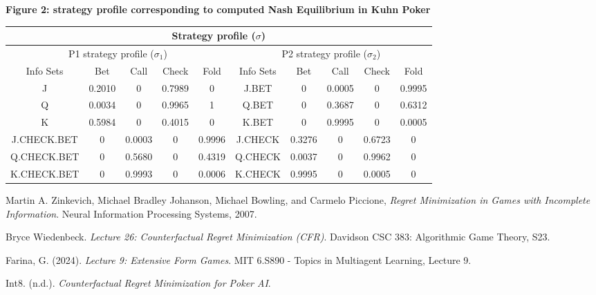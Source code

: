 \documentclass{article}
\begin{document}
\begin{center}
\textbf{Figure 2: strategy profile corresponding to computed Nash Equilibrium in Kuhn Poker}
\begin{tabular}{||c | c c c c||c | c c c c||}
\hline\hline

 \multicolumn{10}{||c||}{Strategy profile ($\sigma$)} \\
 
\hline\hline
 \multicolumn{5}{||c||}{P1 strategy profile ($\sigma_1$)} & 
 \multicolumn{5}{||c||}{P2 strategy profile ($\sigma_2$)} \\

 \hline
 Info Sets & Bet & Call & Check  & Fold &
 Info Sets & Bet & Call & Check  & Fold
 \\ [0.5ex] 
 \hline\hline
 J & 0.2010 & 0 & 0.7989 & 0 & 
 J.BET & 0 & 0.0005 & 0 & 0.9995\\ [1ex] 
 \hline
 Q & 0.0034 & 0 & 0.9965 & 1 & 
 Q.BET & 0 & 0.3687 & 0 & 0.6312\\ [1ex] 
 \hline
 K & 0.5984 & 0 & 0.4015 & 0 & 
 K.BET & 0 & 0.9995 & 0 & 0.0005\\ [1ex] 
 \hline
 J.CHECK.BET & 0 & 0.0003 & 0 & 0.9996 & 
 J.CHECK & 0.3276 & 0 & 0.6723 & 0\\ [1ex] 
 \hline
 Q.CHECK.BET & 0 & 0.5680 & 0 & 0.4319 & 
 Q.CHECK & 0.0037 & 0 & 0.9962 & 0\\ [1ex] 
 \hline
 K.CHECK.BET & 0 & 0.9993 & 0 & 0.0006 & 
 K.CHECK & 0.9995 & 0 & 0.0005 & 0\\ [1ex] 
 \hline
\end{tabular}
\end{center}

\newpage


\begin{thebibliography}{9}

Martin A. Zinkevich, Michael Bradley Johanson, Michael Bowling, and Carmelo Piccione, \emph{Regret Minimization in Games with Incomplete Information}. Neural Information Processing Systems, 2007.

Bryce Wiedenbeck. \textit{Lecture 26: Counterfactual Regret Minimization (CFR)}. 
Davidson CSC 383: Algorithmic Game Theory, S23. 

 Farina, G. (2024). \textit{Lecture 9: Extensive Form Games}. MIT 6.S890 - Topics in Multiagent Learning, Lecture 9.

 Int8. (n.d.). \textit{Counterfactual Regret Minimization for Poker AI}.

\end{thebibliography}
\end{document}

